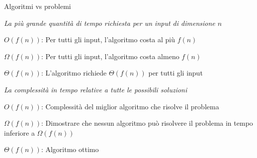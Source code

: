 \begin{frame}{Algoritmi vs problemi}

{\em La più grande quantità di tempo richiesta per un input di dimensione $n$}
\BI
\item \alert{$O(f(n))$}: Per tutti gli input, l'algoritmo costa al più $f(n)$ 
\item \alert{$\Omega(f(n))$}: Per tutti gli input, l'algoritmo costa almeno $f(n)$ 
\item \alert{$\Theta(f(n))$}: L'algoritmo richiede $\Theta(f(n))$ per tutti gli input
\EI

\bigskip
{}
{\em La complessità in tempo relative a tutte le possibili soluzioni}
\BI
\item \alert{$O(f(n))$}: Complessità del miglior algoritmo che risolve il 
problema
\item \alert{$\Omega(f(n))$}: Dimostrare che nessun algoritmo può risolvere il problema in tempo inferiore a $\Omega(f(n))$
\item \alert{$\Theta(f(n))$}: Algoritmo ottimo
\EI



\end{frame}

